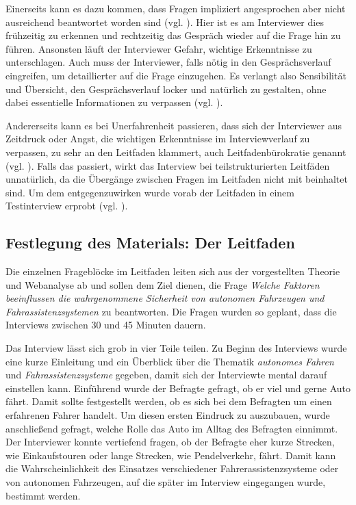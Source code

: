 \documentclass[12pt]{article}
\begin{document}
Einerseits kann es dazu kommen, dass Fragen impliziert angesprochen aber nicht ausreichend beantwortet worden sind (vgl. \cite[114]{flick1995qualitative}). Hier ist es am Interviewer dies frühzeitig zu erkennen und rechtzeitig das Gespräch wieder auf die Frage hin zu führen. Ansonsten läuft der Interviewer Gefahr, wichtige Erkenntnisse zu unterschlagen. Auch muss der Interviewer, falls nötig in den Gesprächsverlauf eingreifen, um detaillierter auf die Frage einzugehen. Es verlangt also Sensibilität und Übersicht, den Gesprächsverlauf locker und natürlich zu gestalten, ohne dabei essentielle Informationen zu verpassen (vgl. \cite[130]{brosius2008methoden}).

Andererseits kann es bei Unerfahrenheit passieren, dass sich der Interviewer aus Zeitdruck oder Angst, die wichtigen Erkenntnisse im Interviewverlauf zu verpassen, zu sehr an den Leitfaden klammert, auch \glqq Leitfadenbürokratie\grqq{} genannt (vgl. \cite[101]{hopf1978pseudo}). Falls das passiert, wirkt das Interview bei teilstrukturierten Leitfäden unnatürlich, da die Übergänge zwischen Fragen im Leitfaden nicht mit beinhaltet sind. Um dem entgegenzuwirken wurde vorab der Leitfaden in einem Testinterview erprobt (vgl. \cite[130]{brosius2008methoden}).

\subsection{Festlegung des Materials: Der Leitfaden}
Die einzelnen Frageblöcke im Leitfaden leiten sich aus der vorgestellten Theorie und Webanalyse ab und sollen dem Ziel dienen, die Frage \emph{Welche Faktoren beeinflussen die wahrgenommene Sicherheit von autonomen Fahrzeugen und Fahrassistenzsystemen} zu beantworten. Die Fragen wurden so geplant, dass die Interviews zwischen 30 und 45 Minuten dauern.

Das Interview lässt sich grob in vier Teile teilen. Zu Beginn des Interviews wurde eine kurze Einleitung und ein Überblick über die Thematik \emph{autonomes Fahren} und \emph{Fahrassistenzsysteme} gegeben, damit sich der Interviewte mental darauf einstellen kann.
Einführend wurde der Befragte gefragt, ob er viel und gerne Auto fährt. Damit sollte festgestellt werden, ob es sich bei dem Befragten um einen erfahrenen Fahrer handelt. Um diesen ersten Eindruck zu auszubauen, wurde anschließend gefragt, welche Rolle das Auto im Alltag des Befragten einnimmt. Der Interviewer konnte vertiefend fragen, ob der Befragte eher kurze Strecken, wie Einkaufstouren oder lange Strecken, wie Pendelverkehr, fährt. Damit kann die Wahrscheinlichkeit des Einsatzes verschiedener Fahrerassistenzsysteme oder von autonomen Fahrzeugen, auf die später im Interview eingegangen wurde, bestimmt werden.
\end{document}
